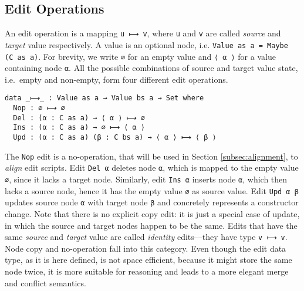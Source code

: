 \documentclass{sigplanconf}
\theoremstyle{plain}
\begin{document}
\subsection{Edit Operations}
An edit operation is a mapping \texttt{u ⟼ v}, where \texttt{u} and
\texttt{v} are called \emph{source} and \emph{target} value
respectively.
%
A value is an optional node, i.e.  \texttt{Value as a = Maybe (C as
  a)}. 
%
For brevity, we write \texttt{∅} for an empty value and \texttt{⟨ α ⟩}
for a value containing node \texttt{α}.
% 
All the possible combinations of source and target value state, i.e.\
empty and non-empty, form four different edit operations.
\begin{verbatim}
data _⟼_ : Value as a → Value bs a → Set where
  Nop : ∅ ⟼ ∅
  Del : (α : C as a) → ⟨ α ⟩ ⟼ ∅
  Ins : (α : C as a) → ∅ ⟼ ⟨ α ⟩
  Upd : (α : C as a) (β : C bs a) → ⟨ α ⟩ ⟼ ⟨ β ⟩
\end{verbatim}
The \texttt{Nop} edit is a no-operation, that will be
used in Section \ref{subsec:alignment}, to \emph{align} edit scripts.
%
Edit \texttt{Del α} deletes node \texttt{α}, which is mapped to
the empty value \texttt{∅}, since it lacks a target node.
%
Similarly, edit \texttt{Ins α} inserts node \texttt{α}, which
then lacks a source node, hence it has the empty value \texttt{∅} 
as source value.
%
Edit \texttt{Upd α β} updates source node \texttt{α} with target node
\texttt{β} and concretely represents a constructor change.
%
Note that there is no explicit copy edit: it is just a special case of
update, in which the source and target nodes happen to be the same.
%
Edits that have the same \emph{source} and \emph{target} value are
called \emph{identity} edits---they have type \texttt{v
  ⟼ v}.
%
Node copy and no-operation fall into this category.
%
Even though the edit data type, as it is here defined, is not space
efficient, because it might store the same node twice, it is more
suitable for reasoning and leads to a more elegant merge and conflict
semantics.
%
	
\end{document}
